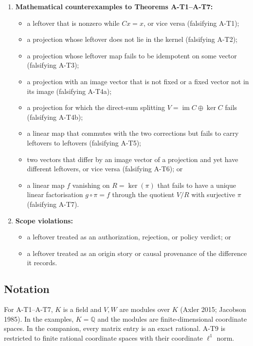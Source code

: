 \documentclass[
  11pt,
]{article}
\providecommand{\tightlist}{%
  \setlength{\itemsep}{0pt}\setlength{\parskip}{0pt}}
\begin{document}
\begin{enumerate}
\def\labelenumi{\arabic{enumi}.}
\tightlist
\item
  \textbf{Mathematical counterexamples to Theorems A-T1--A-T7:}

  \begin{itemize}
  \tightlist
  \item
    a leftover that is nonzero while \(Cx=x\), or vice versa (falsifying A-T1);
  \item
    a projection whose leftover does not lie in the kernel (falsifying A-T2);
  \item
    a projection whose leftover map fails to be idempotent on some vector (falsifying A-T3);
  \item
    a projection with an image vector that is not fixed or a fixed vector not in its image (falsifying A-T4a);
  \item
    a projection for which the direct-sum splitting \(V = \operatorname{im} C \oplus \ker C\) fails (falsifying A-T4b);
  \item
    a linear map that commutes with the two corrections but fails to carry leftovers to leftovers (falsifying A-T5);
  \item
    two vectors that differ by an image vector of a projection and yet have different leftovers, or vice versa (falsifying A-T6); or
  \item
    a linear map \(f\) vanishing on \(R = \ker(\pi)\) that fails to have a unique linear factorisation \(g \circ \pi = f\) through the quotient \(V/R\) with surjective \(\pi\) (falsifying A-T7).
  \end{itemize}
\item
  \textbf{Scope violations:}

  \begin{itemize}
  \tightlist
  \item
    a leftover treated as an authorization, rejection, or policy verdict; or
  \item
    a leftover treated as an origin story or causal provenance of the difference it records.
  \end{itemize}
\end{enumerate}

\subsection{Notation}\label{notation}

For A-T1--A-T7, \(K\) is a field and \(V,W\) are modules over \(K\) (Axler 2015; Jacobson 1985). In the examples, \(K=\mathbb{Q}\) and the modules are finite-dimensional coordinate spaces. In the companion, every matrix entry is an exact rational. A-T9 is restricted to finite rational coordinate spaces with their coordinate \(\ell^1\) norm.
\end{document}
